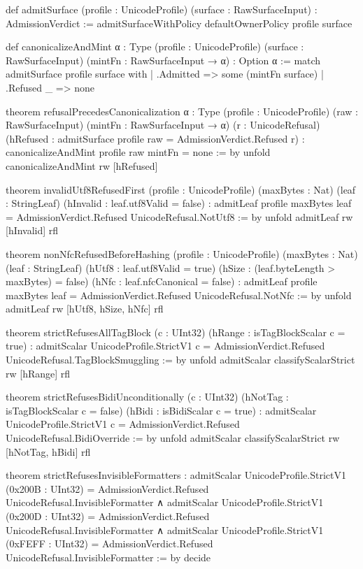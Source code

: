 \documentclass[12pt]{lexlean}
\begin{document}
\begin{lean}
def admitSurface (profile : UnicodeProfile) (surface : RawSurfaceInput) : AdmissionVerdict :=
  admitSurfaceWithPolicy defaultOwnerPolicy profile surface

def canonicalizeAndMint {α : Type} (profile : UnicodeProfile) (surface : RawSurfaceInput)
    (mintFn : RawSurfaceInput → α) : Option α :=
  match admitSurface profile surface with
  | .Admitted  => some (mintFn surface)
  | .Refused _ => none

theorem refusalPrecedesCanonicalization {α : Type} (profile : UnicodeProfile)
    (raw : RawSurfaceInput) (mintFn : RawSurfaceInput → α) (r : UnicodeRefusal)
    (hRefused : admitSurface profile raw = AdmissionVerdict.Refused r) :
    canonicalizeAndMint profile raw mintFn = none := by
  unfold canonicalizeAndMint
  rw [hRefused]

theorem invalidUtf8RefusedFirst (profile : UnicodeProfile) (maxBytes : Nat) (leaf : StringLeaf)
    (hInvalid : leaf.utf8Valid = false) :
    admitLeaf profile maxBytes leaf = AdmissionVerdict.Refused UnicodeRefusal.NotUtf8 := by
  unfold admitLeaf
  rw [hInvalid]
  rfl

theorem nonNfcRefusedBeforeHashing (profile : UnicodeProfile) (maxBytes : Nat) (leaf : StringLeaf)
    (hUtf8 : leaf.utf8Valid = true)
    (hSize : (leaf.byteLength > maxBytes) = false)
    (hNfc  : leaf.nfcCanonical = false) :
    admitLeaf profile maxBytes leaf = AdmissionVerdict.Refused UnicodeRefusal.NotNfc := by
  unfold admitLeaf
  rw [hUtf8, hSize, hNfc]
  rfl

theorem strictRefusesAllTagBlock (c : UInt32)
    (hRange : isTagBlockScalar c = true) :
    admitScalar UnicodeProfile.StrictV1 c = AdmissionVerdict.Refused UnicodeRefusal.TagBlockSmuggling := by
  unfold admitScalar classifyScalarStrict
  rw [hRange]
  rfl

theorem strictRefusesBidiUnconditionally (c : UInt32)
    (hNotTag : isTagBlockScalar c = false)
    (hBidi   : isBidiScalar c = true) :
    admitScalar UnicodeProfile.StrictV1 c = AdmissionVerdict.Refused UnicodeRefusal.BidiOverride := by
  unfold admitScalar classifyScalarStrict
  rw [hNotTag, hBidi]
  rfl

theorem strictRefusesInvisibleFormatters :
    admitScalar UnicodeProfile.StrictV1 (0x200B : UInt32) = AdmissionVerdict.Refused UnicodeRefusal.InvisibleFormatter ∧
    admitScalar UnicodeProfile.StrictV1 (0x200D : UInt32) = AdmissionVerdict.Refused UnicodeRefusal.InvisibleFormatter ∧
    admitScalar UnicodeProfile.StrictV1 (0xFEFF : UInt32) = AdmissionVerdict.Refused UnicodeRefusal.InvisibleFormatter := by
  decide


\end{lean}
\end{document}
